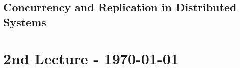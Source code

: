 \documentclass{article}
\begin{document}
\begin{adjustwidth}{2em}{2em}
		\subsection{Concurrency and Replication in Distributed Systems}
		\begin{adjustwidth}{2em}{2em}
		\end{adjustwidth}
	\end{adjustwidth}
	
	\newpage
	
	\section{2nd Lecture - \today}
	\begin{adjustwidth}{2em}{2em}
	\end{adjustwidth}
\end{document}
